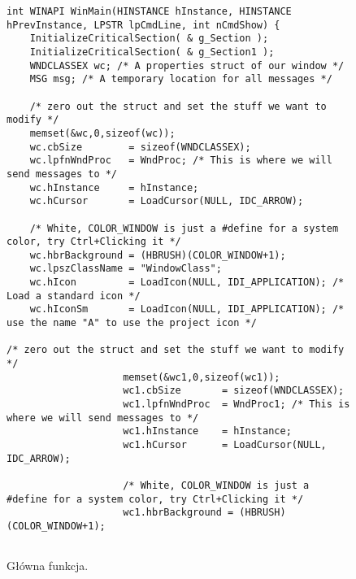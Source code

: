 \documentclass[a4paper,twoside,12pt]{mgr}
\begin{document}
\begin{figure}[H]
\centering
\begin{lstlisting}[frame=single]		
int WINAPI WinMain(HINSTANCE hInstance, HINSTANCE hPrevInstance, LPSTR lpCmdLine, int nCmdShow) {
	InitializeCriticalSection( & g_Section );
	InitializeCriticalSection( & g_Section1 );
	WNDCLASSEX wc; /* A properties struct of our window */
	MSG msg; /* A temporary location for all messages */

	/* zero out the struct and set the stuff we want to modify */
	memset(&wc,0,sizeof(wc));
	wc.cbSize		 = sizeof(WNDCLASSEX);
	wc.lpfnWndProc	 = WndProc; /* This is where we will send messages to */
	wc.hInstance	 = hInstance;
	wc.hCursor		 = LoadCursor(NULL, IDC_ARROW);
	
	/* White, COLOR_WINDOW is just a #define for a system color, try Ctrl+Clicking it */
	wc.hbrBackground = (HBRUSH)(COLOR_WINDOW+1);
	wc.lpszClassName = "WindowClass";
	wc.hIcon		 = LoadIcon(NULL, IDI_APPLICATION); /* Load a standard icon */
	wc.hIconSm		 = LoadIcon(NULL, IDI_APPLICATION); /* use the name "A" to use the project icon */
	
/* zero out the struct and set the stuff we want to modify */
					memset(&wc1,0,sizeof(wc1));
					wc1.cbSize		 = sizeof(WNDCLASSEX);
					wc1.lpfnWndProc	 = WndProc1; /* This is where we will send messages to */
					wc1.hInstance	 = hInstance;
					wc1.hCursor		 = LoadCursor(NULL, IDC_ARROW);
	
					/* White, COLOR_WINDOW is just a #define for a system color, try Ctrl+Clicking it */
					wc1.hbrBackground = (HBRUSH)(COLOR_WINDOW+1);
					
\end{lstlisting}
\caption{Główna funkcja.}%
\label{rys:etykieta}
\end{figure}	
\end{document}
